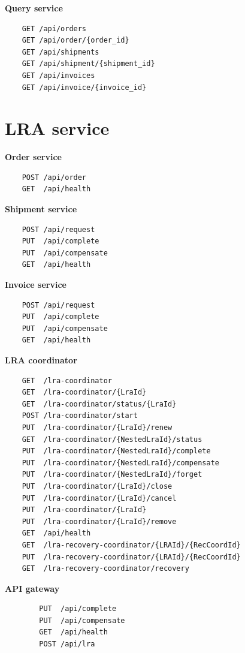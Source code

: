 \documentclass[oneside,
  digital, %
  table,   %
  nolof,     %
  nolot,     %
]{fithesis3}
\begin{document}
\noindent
\textbf{Query service}

\begin{verbatim}
	GET /api/orders
	GET /api/order/{order_id}
	GET /api/shipments
	GET /api/shipment/{shipment_id}
	GET /api/invoices
	GET /api/invoice/{invoice_id}
\end{verbatim}

\section{LRA service}

\textbf{Order service}

\begin{verbatim}
	POST /api/order
	GET  /api/health
\end{verbatim}

\noindent
\textbf{Shipment service}

\begin{verbatim}
	POST /api/request
	PUT  /api/complete
	PUT  /api/compensate
	GET  /api/health
\end{verbatim}

\noindent
\textbf{Invoice service}

\begin{verbatim}
	POST /api/request
	PUT  /api/complete
	PUT  /api/compensate
	GET  /api/health
\end{verbatim}

\noindent
\textbf{LRA coordinator}

\begin{verbatim}
	GET  /lra-coordinator
	GET  /lra-coordinator/{LraId}
	GET  /lra-coordinator/status/{LraId}
	POST /lra-coordinator/start
	PUT  /lra-coordinator/{LraId}/renew
	GET  /lra-coordinator/{NestedLraId}/status
	PUT  /lra-coordinator/{NestedLraId}/complete
	PUT  /lra-coordinator/{NestedLraId}/compensate
	PUT  /lra-coordinator/{NestedLraId}/forget
	PUT  /lra-coordinator/{LraId}/close
	PUT  /lra-coordinator/{LraId}/cancel
	PUT  /lra-coordinator/{LraId}
	PUT  /lra-coordinator/{LraId}/remove
	GET  /api/health
	GET  /lra-recovery-coordinator/{LRAId}/{RecCoordId}
	PUT  /lra-recovery-coordinator/{LRAId}/{RecCoordId}
	GET  /lra-recovery-coordinator/recovery
\end{verbatim}

\noindent
\textbf{API gateway}

\begin{verbatim}
        PUT  /api/complete
        PUT  /api/compensate
        GET  /api/health
        POST /api/lra
\end{verbatim}
\end{document}
